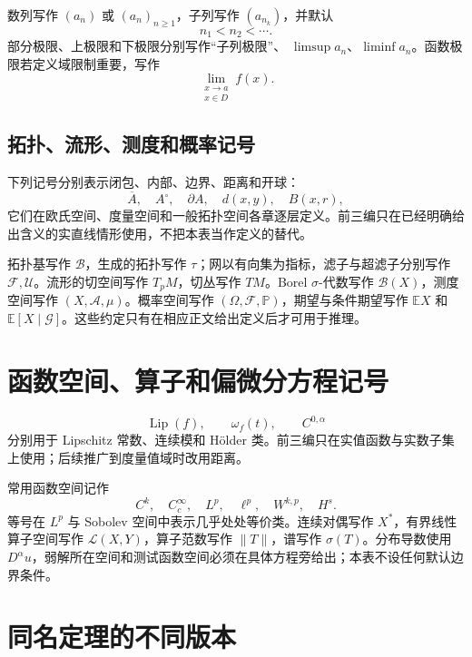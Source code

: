 数列写作 \((a_n)\) 或 \((a_n)_{n\ge1}\)，子列写作 \((a_{n_k})\)，并默认
\[
 n_1<n_2<\cdots.
\]
部分极限、上极限和下极限分别写作“子列极限”、
\(\limsup a_n\)、\(\liminf a_n\)。函数极限若定义域限制重要，写作
\[
 \lim_{\substack{x\to a\\x\in D}}f(x).
\]

\subsection*{拓扑、流形、测度和概率记号}

\begin{remark}[拓扑记号]
下列记号分别表示闭包、内部、边界、距离和开球：
\[
 \overline A,\quad A^\circ,\quad\partial A,\quad
 d(x,y),\quad B(x,r),
\]
它们在欧氏空间、度量空间和一般拓扑空间各章逐层定义。前三编只在已经明确给出含义的实直线情形使用，不把本表当作定义的替代。
\end{remark}

拓扑基写作 \(\mathcal B\)，生成的拓扑写作 \(\tau\)；网以有向集为指标，滤子与超滤子分别写作 \(\mathcal F,\mathcal U\)。流形的切空间写作 \(T_pM\)，切丛写作 \(TM\)。Borel \(\sigma\)-代数写作 \(\mathcal B(X)\)，测度空间写作 \((X,\mathcal A,\mu)\)。概率空间写作 \((\Omega,\mathcal F,\mathbb P)\)，期望与条件期望写作 \(\mathbb E X\) 和 \(\mathbb E[X\mid\mathcal G]\)。这些约定只有在相应正文给出定义后才可用于推理。

\section{函数空间、算子和偏微分方程记号}

\begin{remark}[定量连续性记号]
\[
 \operatorname{Lip}(f),\qquad
 \omega_f(t),\qquad C^{0,\alpha}
\]
分别用于 Lipschitz 常数、连续模和 Hölder 类。前三编只在实值函数与实数子集上使用；后续推广到度量值域时改用距离。
\end{remark}

\begin{remark}[函数空间与弱导数记号]
常用函数空间记作
\[
 C^k,\quad C_c^\infty,\quad L^p,\quad \ell^p,\quad
 W^{k,p},\quad H^s.
\]
等号在 \(L^p\) 与 Sobolev 空间中表示几乎处处等价类。连续对偶写作 \(X^*\)，有界线性算子空间写作 \(\mathcal L(X,Y)\)，算子范数写作 \(\|T\|\)，谱写作 \(\sigma(T)\)。分布导数使用 \(D^\alpha u\)，弱解所在空间和测试函数空间必须在具体方程旁给出；本表不设任何默认边界条件。
\end{remark}

\section{同名定理的不同版本}

